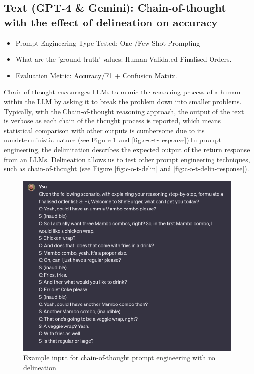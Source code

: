 
\subsection{Text (GPT-4 \& Gemini): Chain-of-thought with the effect of delineation on accuracy}

\begin{itemize}
    \item Prompt Engineering Type Tested:  One-/Few Shot Prompting
    \item What are the 'ground truth' values: Human-Validated Finalised Orders.
    \item Evaluation Metric: Accuracy/F1 + Confusion Matrix.
\end{itemize}

Chain-of-thought encourages LLMs to mimic the reasoning  process of a human within the LLM by asking it to break the problem down into smaller problems.  Typically, with the Chain-of-thought reasoning approach, the output of the text is verbose as each chain of the thought process is reported, which means statistical comparison with other outputs is cumbersome due to its nondeterministic nature (see Figure \ref{fig:c-o-t-prompt} and \ref{fig:c-o-t-response}).In prompt engineering, the delimitation describes the expected output of the return response from an LLMs. Delineation allows us to test other prompt engineering techniques, such as chain-of-thought (see Figure \ref{fig:c-o-t-delin} and \ref{fig:c-o-t-delin-response}).

\begin{figure}
    \centering
    \includegraphics[width=1\linewidth]{sections//images/cot_no_delineation.png}
    \caption{Example input for chain-of-thought prompt engineering with no delineation}
    \label{fig:c-o-t-prompt}
\end{figure}

